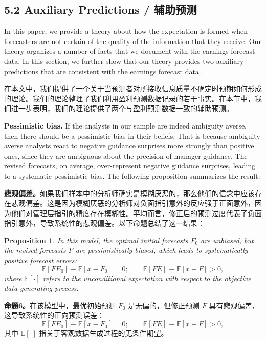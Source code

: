 \documentclass[12pt,a4paper]{article}
\newenvironment{original}
  {\par\medskip\noindent\ignorespaces}
  {\par\medskip}
\newenvironment{translation}
  {\par\noindent{\color{transblue}\ignorespaces}}
  {\par\bigskip}
\newtheorem{proposition}[theorem]{Proposition}
\begin{document}
\subsection{5.2 Auxiliary Predictions / 辅助预测}

\begin{original}
In this paper, we provide a theory about how the expectation is formed when forecasters are not certain of the quality of the information that they receive. Our theory organizes a number of facts that we document with the earnings forecast data. In this section, we further show that our theory provides two auxiliary predictions that are consistent with the earnings forecast data.
\end{original}
\begin{translation}
在本文中，我们提供了一个关于当预测者对所接收信息质量不确定时预期如何形成的理论。我们的理论整理了我们利用盈利预测数据记录的若干事实。在本节中，我们进一步表明，我们的理论提供了两个与盈利预测数据一致的辅助预测。
\end{translation}

\begin{original}
\textbf{Pessimistic bias.} If the analysts in our sample are indeed ambiguity averse, then there should be a pessimistic bias in their beliefs. That is because ambiguity averse analysts react to negative guidance surprises more strongly than positive ones, since they are ambiguous about the precision of manager guidance. The revised forecasts, on average, over-represent negative guidance surprises, leading to a systematic pessimistic bias. The following proposition summarizes the result:
\end{original}
\begin{translation}
\textbf{悲观偏差。}如果我们样本中的分析师确实是模糊厌恶的，那么他们的信念中应该存在悲观偏差。这是因为模糊厌恶的分析师对负面指引意外的反应强于正面意外，因为他们对管理层指引的精度存在模糊性。平均而言，修正后的预测过度代表了负面指引意外，导致系统性的悲观偏差。以下命题总结了这一结果：
\end{translation}

\begin{proposition}
In this model, the optimal initial forecasts $F_0$ are unbiased, but the revised forecasts $F$ are pessimistically biased, which leads to systematically positive forecast errors:
\[
\mathbb{E}[FE_0] \equiv \mathbb{E}[x - F_0] = 0; \qquad \mathbb{E}[FE] \equiv \mathbb{E}[x - F] > 0,
\]
where $\mathbb{E}[\cdot]$ refers to the unconditional expectation with respect to the objective data generating process.
\end{proposition}
\begin{translation}
\textbf{命题6。}在该模型中，最优初始预测 $F_0$ 是无偏的，但修正预测 $F$ 具有悲观偏差，这导致系统性的正向预测误差：
\[
\mathbb{E}[FE_0] \equiv \mathbb{E}[x - F_0] = 0; \qquad \mathbb{E}[FE] \equiv \mathbb{E}[x - F] > 0,
\]
其中 $\mathbb{E}[\cdot]$ 指关于客观数据生成过程的无条件期望。
\end{translation}
\end{document}
